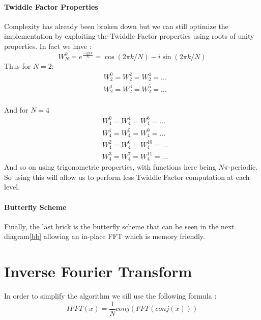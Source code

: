 \documentclass[a4paper]{report}
\begin{document}
\paragraph{Twiddle Factor Properties}
Complexity has already been broken down but we can still optimize the implementation by exploiting the Twiddle Factor properties using roots of unity properties. In fact we have :
\[
W_N^k=e^{\frac{-i 2 \pi k}{N}}=\cos(2\pi k/N)-i\sin(2 \pi k/N)
\]
Thus for $N=2$:
\begin{align*}
&W^0_2=W^2_2=W_2^4=...\\
&W_2^1=W_2^3=W_2^5=...
\end{align*}
\\And for $N=4$
\begin{align*}
&W_4^0=W_4^4=W_4^8=...\\
&W_4^1=W_4^5=W_4^9=...\\
&W_4^2=W_4^6=W_4^{10}=...\\
&W_4^3=W_4^7=W_4^{11}=...
\end{align*}
And so on using trigonometric properties, with functions here being $N\pi$-periodic.
So using this will allow us to perform less Twiddle Factor computation at each level.
\paragraph{Butterfly Scheme}
Finally, the last brick is the butterfly scheme that can be seen in the next diagram\ref{bb} allowing an in-place FFT which is memory friendly.

\section{Inverse Fourier Transform}
In order to simplify the algorithm we sill use the following formula :
\[
IFFT(x)=\frac{1}{N}conj(FFT(conj(x)))
\]
\end{document}

